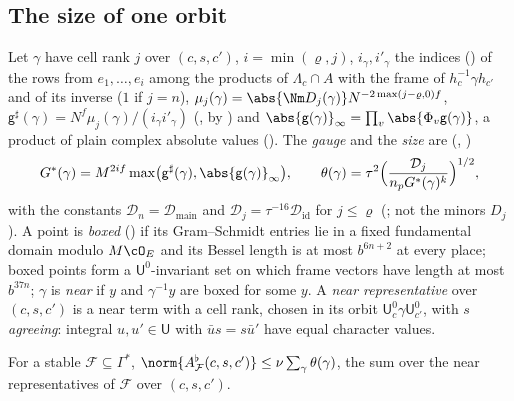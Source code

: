 \subsection{The size of one orbit}\label{sp-remain:ss:size}

Let $\gamma$ have cell rank $j$ over $(c,s,c')$, $i=\min(\varrho,j)$, $i_\gamma,i'_\gamma$ the indices
() of the rows from $e_1,\dots,e_i$ among the products of
$\Lambda_c\cap A$ with the frame of $h_c^{-1}\gamma h_{c'}$ and of its inverse ($1$ if $j=n$),
$\mu_j(\gamma)=\abs{\Nm D_j(\gamma)}N^{-2\max(j-\varrho,0)f}$,
$\mathsf g^\sharp(\gamma)=N^f\mu_j(\gamma)/(i_\gamma i'_\gamma)$ (, by
) and $\abs{\mathsf g(\gamma)}_\infty=\prod_v\abs{\Phi_v\mathsf
g(\gamma)}$, a product of plain complex absolute values (). The \emph{gauge} and the \emph{size} are
(, )
\[
G^*(\gamma)=M^{2if}\max\bigl(\mathsf g^\sharp(\gamma),\abs{\mathsf g(\gamma)}_\infty\bigr),\qquad \theta(\gamma)=\tau^2\Bigl(\frac{\mathcal D_j}{n_pG^*(\gamma)^k}\Bigr)^{1/2},
\]
with the constants $\mathcal D_n=\mathcal D_{\mathrm{main}}$ and $\mathcal D_j=\tau^{-16}\mathcal D_{\mathrm{id}}$ for
$j\le\varrho$ (; not the minors $D_j$).
A point is \emph{boxed} () if its Gram--Schmidt entries lie in a
fixed fundamental domain modulo $M\cO_E$ and its Bessel length is at most $b^{6n+2}$ at every place;
boxed points form a $\mathsf U^0$-invariant set on which frame vectors have length at most $b^{37n}$; $\gamma$ is \emph{near} if
$y$ and $\gamma^{-1}y$ are boxed for some $y$. A \emph{near representative} over $(c,s,c')$ is a near
term with a cell rank, chosen in its orbit $\mathsf U^0_c\gamma\mathsf U^0_{c'}$, with $s$
\emph{agreeing}: integral $u,u'\in\mathsf U$ with $\bar us=s\bar u'$ have equal character values.

\begin{proposition}
\label{sp-remain:prop:size}
For a stable $\mathcal F\subseteq\Gamma^*$, $\norm{A^\flat_{\mathcal F}(c,s,c')}\le\nu\sum_\gamma
\theta(\gamma)$, the sum over the near representatives of $\mathcal F$ over $(c,s,c')$.
\end{proposition}

